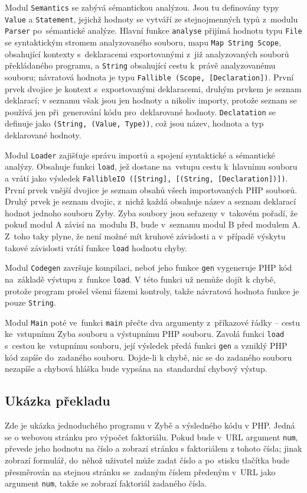 \documentclass[a4paper,12pt]{article}
\begin{document}
Modul \texttt{Semantics} se zabývá sémantickou analýzou. Jsou tu definovány typy \texttt{Value} a \texttt{Statement}, jejichž hodnoty se vytváří ze stejnojmenných typů z~modulu \texttt{Parser} po~sémantické analýze. Hlavní funkce \texttt{analyse} přijímá hodnotu typu \texttt{File} se syntaktickým stromem analyzovaného souboru, mapu \texttt{Map String Scope}, obsahující kontexty s~deklaracemi exportovanými z~již analyzovaných souborů překládaného programu, a \texttt{String} obsahující cestu k~právě analyzovanému souboru; návratová hodnota je typu \texttt{Fallible (Scope, [Declaration])}. První prvek dvojice je kontext s~exportovanými deklaracemi, druhým prvkem je seznam deklarací; v seznamu však jsou jen hodnoty a nikoliv importy, protože seznam se používá jen při~generování kódu pro~deklarované hodnoty. \texttt{Declatation} se definuje jako \texttt{(String, (Value, Type))}, což jsou název, hodnota a typ deklarované hodnoty.

Modul \texttt{Loader} zajišťuje správu importů a spojení syntaktické a sémantické analýzy. Obsahuje funkci \texttt{load}, jež dostane na~vstupu cestu k~hlavnímu souboru a vrátí jako výsledek \texttt{FallibleIO ([String], [(String, [Declaration])])}. První prvek vnější dvojice je seznam obsahů všech importovaných PHP souborů. Druhý prvek je seznam dvojic, z~nichž každá obsahuje název a seznam deklarací hodnot jednoho souboru Zyby. Zyba soubory jsou seřazeny v~takovém pořadí, že pokud modul A závisí na~modulu B, bude v~seznamu modul B před modulem A. Z~toho taky plyne, že není možné mít kruhové závislosti a v~případě výskytu takové závislosti vrátí funkce \texttt{load} hodnotu chyby.

Modul \texttt{Codegen} završuje kompilaci, neboť jeho funkce \texttt{gen} vygeneruje PHP kód na~základě výstupu z~funkce \texttt{load}. V této funkci už nemůže dojít k chybě, protože program prošel všemi fázemi kontroly, takže návratová hodnota funkce je pouze \texttt{String}.

Modul \texttt{Main} poté ve~funkci \texttt{main} přečte dva argumenty z~příkazové řádky -- cestu ke~vstupnímu Zyba souboru a výstupnímu PHP souboru. Zavolá funkci \texttt{load} s~cestou ke~vstupnímu souboru, její výsledek předá funkci \texttt{gen} a vzniklý PHP kód zapíše do~zadaného souboru. Dojde-li k chybě, nic se do zadaného souboru nezapíše a chybová hláška bude vypsána na~standardní chybový výstup.

\subsection{Ukázka překladu}
Zde je ukázka jednoduchého programu v Zybě a výsledného kódu v PHP. Jedná se o webovou stránku pro výpočet faktoriálu. Pokud bude v~URL argument \texttt{num}, převede jeho hodnotu na číslo a zobrazí stránku s faktoriálem z tohoto čísla; jinak zobrazí formulář, do~něhož uživatel může zadat číslo a po~stisku tlačítka bude přesměrován na stejnou stránku se~zadaným číslem předeným v~URL jako argument \texttt{num}, takže se zobrazí faktoriál zadaného čísla.
\end{document}
